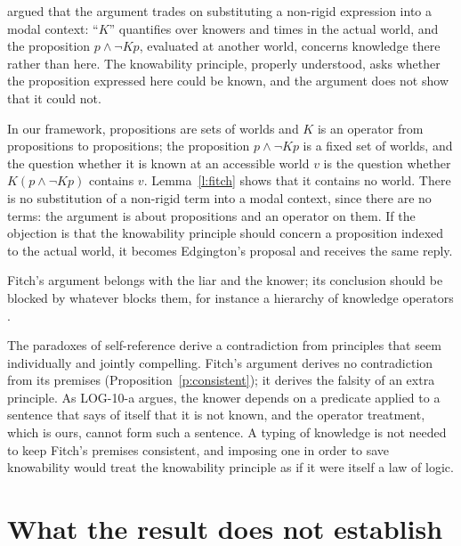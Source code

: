 \documentclass{situationist-preprint}
\begin{document}
\begin{objection}
\citet{Kvanvig2006} argued that the argument trades on substituting a non-rigid expression into a modal context: \enquote{$K$} quantifies over knowers and times in the actual world, and the proposition $p \wedge \neg Kp$, evaluated at another world, concerns knowledge there rather than here. The knowability principle, properly understood, asks whether the proposition expressed here could be known, and the argument does not show that it could not.
\end{objection}

\begin{reply}
In our framework, propositions are sets of worlds and $K$ is an operator from propositions to propositions; the proposition $p \wedge \neg Kp$ is a fixed set of worlds, and the question whether it is known at an accessible world $v$ is the question whether $K(p \wedge \neg Kp)$ contains $v$. Lemma~\ref{l:fitch} shows that it contains no world. There is no substitution of a non-rigid term into a modal context, since there are no terms: the argument is about propositions and an operator on them. If the objection is that the knowability principle should concern a proposition indexed to the actual world, it becomes Edgington's proposal and receives the same reply.
\end{reply}

\begin{objection}
Fitch's argument belongs with the liar and the knower; its conclusion should be blocked by whatever blocks them, for instance a hierarchy of knowledge operators \citep{Beall2000}.
\end{objection}

\begin{reply}
The paradoxes of self-reference derive a contradiction from principles that seem individually and jointly compelling. Fitch's argument derives no contradiction from its premises (Proposition~\ref{p:consistent}); it derives the falsity of an extra principle. As LOG-10-a argues, the knower depends on a predicate applied to a sentence that says of itself that it is not known, and the operator treatment, which is ours, cannot form such a sentence. A typing of knowledge is not needed to keep Fitch's premises consistent, and imposing one in order to save knowability would treat the knowability principle as if it were itself a law of logic.
\end{reply}

\section{What the result does not establish}
\end{document}
